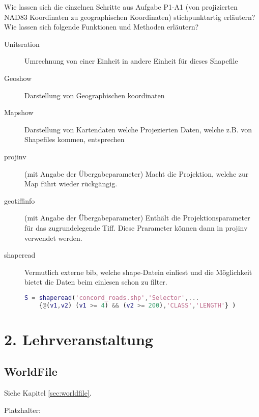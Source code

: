 Wie lassen sich die einzelnen Schritte aus Aufgabe P1-A1 (von projizierten NAD83 Koordinaten zu geographischen Koordinaten) stichpunktartig erläutern?\\
Wie lassen sich folgende Funktionen und Methoden erläutern?

\begin{description}
	\item[Unitsration] Umrechnung von einer Einheit in andere Einheit für dieses Shapefile
	\item[Geoshow] Darstellung von Geographischen koordinaten
	\item[Mapshow] Darstellung von Kartendaten welche Projezierten Daten, welche z.B. von Shapefiles kommen, entsprechen
	\item[projinv] (mit Angabe der Übergabeparameter) Macht die Projektion, welche zur Map führt wieder rückgängig.
	\item[geotiffinfo] (mit Angabe der Übergabeparameter) Enthält die Projektionsparameter für das zugrundelegende Tiff. Diese Prarameter können dann in projinv verwendet werden.
	\item[shaperead] Vermutlich externe bib, welche shape-Datein einliest und die Möglichkeit bietet die Daten beim einlesen schon zu filter.
	\begin{lstlisting}[caption=shaperead.m, language=matlab, label=shaperead]
	S = shaperead('concord_roads.shp','Selector',... 
	{@(v1,v2) (v1 >= 4) && (v2 >= 200),'CLASS','LENGTH'} )
	\end{lstlisting}
	
\end{description}

\chapter{2. Lehrveranstaltung}
\label{ch:2.-lehrveranstaltung}

\section{WorldFile}

Siehe Kapitel \ref{sec:worldfile}.

Platzhalter: \cite{adams2009hitchhikers}

